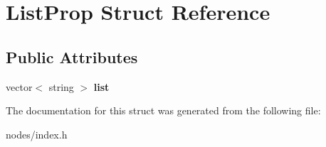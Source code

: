 \hypertarget{structListProp}{}\section{List\+Prop Struct Reference}
\label{structListProp}
\subsection*{Public Attributes}
\begin{DoxyCompactItemize}
\item 
\mbox{\label{structListProp_a198f5e2593758a78e31b4ae777839ce6}} 
vector$<$ string $>$ {\bfseries list}
\end{DoxyCompactItemize}


The documentation for this struct was generated from the following file\+:\begin{DoxyCompactItemize}
\item 
nodes/index.\+h\end{DoxyCompactItemize}
